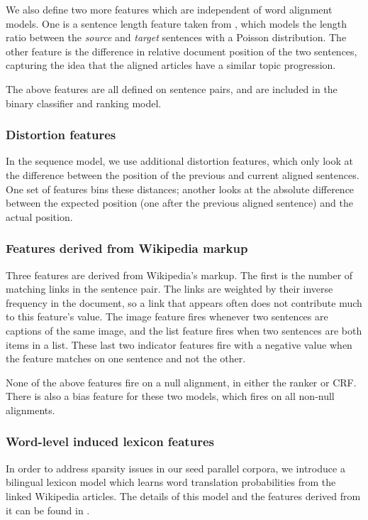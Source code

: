 We also define two more features which are independent of word alignment
models.  One is a sentence length feature taken from \citep{Moore02}, which
models the length ratio between the {\em source} and {\em target} sentences with
a Poisson distribution.  The other feature is the difference in relative
document position of the two sentences, capturing the idea that the aligned
articles have a similar topic progression.

The above features are all defined on sentence pairs, and are included in the
binary classifier and ranking model.
\subsubsection{Distortion features} In the sequence model, we use additional distortion
features, which only look at the difference between the position
of the previous and current aligned sentences.  One set of
features bins these distances; another looks at the
absolute difference between the expected position (one after the
previous aligned sentence) and the actual position.

\subsubsection{Features derived from Wikipedia markup}

Three features are derived from Wikipedia's
markup. The first is the number of matching links in the sentence
pair. The links are weighted by their inverse frequency in the
document, so a link that appears often does not contribute much to
this feature's value.  The image feature fires whenever two
sentences are captions of the same image, and the list feature
fires when two sentences are both items in a list.  These last two
indicator features fire with a negative value when the feature
matches on one sentence and not the other.

None of the above features fire on a null alignment, in either the
ranker or CRF.  There is also a bias feature for these two models, which
fires on all non-null alignments.

\subsubsection{Word-level induced lexicon features}
In order to address sparsity issues in our seed parallel corpora, we introduce a
bilingual lexicon model which learns word translation probabilities from the
linked Wikipedia articles. The details of this model and the features derived
from it can be found in \citep{Smith10}.

